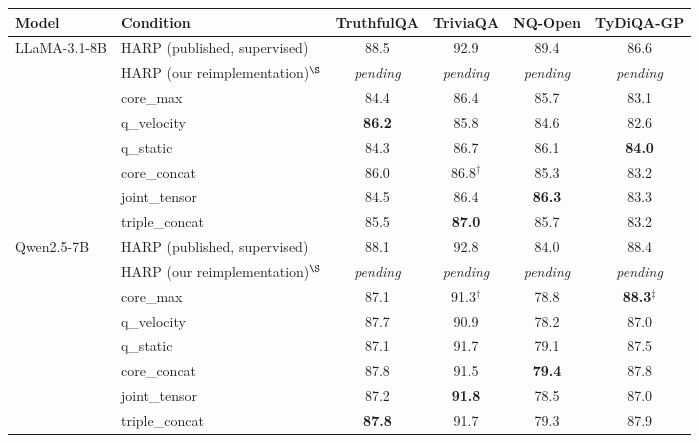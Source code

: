 \documentclass[11pt,a4paper]{article}
\begin{document}
\begin{table}[h]
\centering\footnotesize
\begin{tabular}{llcccc}
\toprule
\textbf{Model} & \textbf{Condition} & \textbf{TruthfulQA} & \textbf{TriviaQA} & \textbf{NQ-Open} & \textbf{TyDiQA-GP} \\
\midrule
\multirow{8}{*}{LLaMA-3.1-8B}
  & \cellcolor{harpgray}HARP (published, supervised) & \cellcolor{harpgray}88.5 & \cellcolor{harpgray}92.9 & \cellcolor{harpgray}89.4 & \cellcolor{harpgray}86.6 \\
  & \cellcolor{harpgray}HARP (our reimplementation)$^{\S}$ & \cellcolor{harpgray}\textit{pending} & \cellcolor{harpgray}\textit{pending} & \cellcolor{harpgray}\textit{pending} & \cellcolor{harpgray}\textit{pending} \\
  & core\_max      & 84.4 & 86.4 & 85.7 & 83.1 \\
  & q\_velocity    & \textbf{86.2} & 85.8 & 84.6 & 82.6 \\
  & q\_static      & 84.3 & 86.7 & 86.1 & \textbf{84.0} \\
  & core\_concat   & 86.0 & 86.8$^{\dagger}$ & 85.3 & 83.2 \\
  & joint\_tensor  & 84.5 & 86.4 & \textbf{86.3} & 83.3 \\
  & triple\_concat & 85.5 & \textbf{87.0} & 85.7 & 83.2 \\
\midrule
\multirow{8}{*}{Qwen2.5-7B}
  & \cellcolor{harpgray}HARP (published, supervised) & \cellcolor{harpgray}88.1 & \cellcolor{harpgray}92.8 & \cellcolor{harpgray}84.0 & \cellcolor{harpgray}88.4 \\
  & \cellcolor{harpgray}HARP (our reimplementation)$^{\S}$ & \cellcolor{harpgray}\textit{pending} & \cellcolor{harpgray}\textit{pending} & \cellcolor{harpgray}\textit{pending} & \cellcolor{harpgray}\textit{pending} \\
  & core\_max      & 87.1 & 91.3$^{\dagger}$ & 78.8 & \textbf{88.3}$^{\ddagger}$ \\
  & q\_velocity    & 87.7 & 90.9 & 78.2 & 87.0 \\
  & q\_static      & 87.1 & 91.7 & 79.1 & 87.5 \\
  & core\_concat   & 87.8 & 91.5 & \textbf{79.4} & 87.8 \\
  & joint\_tensor  & 87.2 & \textbf{91.8} & 78.5 & 87.0 \\
  & triple\_concat & \textbf{87.8} & 91.7 & 79.3 & 87.9 \\
\bottomrule
\end{tabular}

\end{table}
\end{document}
